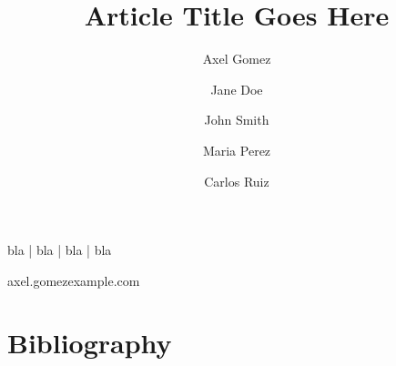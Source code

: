 \documentclass[times, twoside]{style/axelgomez-article}
\begin{document}
\title{Article Title Goes Here}

\author[1,\Letter]{Axel Gomez}
\author[1]{Jane Doe}
\author[2]{John Smith}
\author[2,3]{Maria Perez}
\author[3]{Carlos Ruiz}


\maketitle



\begin{keywords}
bla | bla | bla | bla
\end{keywords}

\begin{corrauthor}
axel.gomez\at example.com
\end{corrauthor}







\section*{Bibliography}


\onecolumn
\newpage



\end{document}
